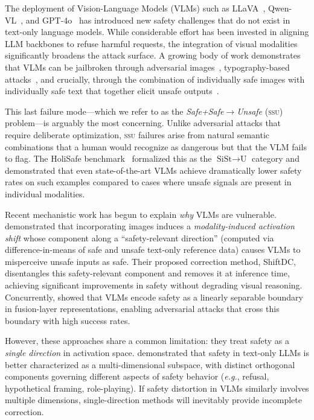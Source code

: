 \documentclass{article}
\newcommand{\ssu}{\textsc{ssu}}
\newcommand{\eg}{\emph{e.g.}}
\begin{document}
The deployment of Vision-Language Models (VLMs) such as LLaVA~\citep{liu2024visual},
Qwen-VL~\citep{bai2025qwen}, and GPT-4o~\citep{hurst2024gpt4o} has introduced
new safety challenges that do not exist in text-only language models.  While
considerable effort has been invested in aligning LLM backbones to refuse
harmful requests, the integration of visual modalities significantly broadens the
attack surface.  A growing body of work demonstrates that VLMs can be jailbroken
through adversarial images~\citep{qi2024visual,niu2024jailbreaking}, typography-based
attacks~\citep{gong2023figstep}, and crucially, through the combination of
individually safe images with individually safe text that together elicit unsafe
outputs~\citep{wang2024siuo,lee2025holisafe}.

This last failure mode---which we refer to as the \emph{Safe+Safe$\to$Unsafe}
(\ssu) problem---is arguably the most concerning.  Unlike adversarial attacks
that require deliberate optimization, \ssu{} failures arise from natural semantic
combinations that a human would recognize as dangerous but that the VLM fails to
flag.  The HoliSafe benchmark~\citep{lee2025holisafe} formalized this as the
$\text{SiSt}{\to}\text{U}$ category and demonstrated that even state-of-the-art
VLMs achieve dramatically lower safety rates on such examples compared to cases
where unsafe signals are present in individual modalities.

Recent mechanistic work has begun to explain \emph{why} VLMs are vulnerable.
\citet{zou2025shiftdc} demonstrated that incorporating images induces a
\emph{modality-induced activation shift} whose component along a
``safety-relevant direction'' (computed via difference-in-means of safe and
unsafe text-only reference data) causes VLMs to misperceive unsafe inputs as
safe.  Their proposed correction method, ShiftDC, disentangles this
safety-relevant component and removes it at inference time, achieving significant
improvements in safety without degrading visual reasoning.  Concurrently,
\citet{song2025jailbound} showed that VLMs encode safety as a linearly separable
boundary in fusion-layer representations, enabling adversarial attacks that cross
this boundary with high success rates.

However, these approaches share a common limitation: they treat safety as a
\emph{single direction} in activation space.  \citet{zhang2025hidden}
demonstrated that safety in text-only LLMs is better characterized as a
multi-dimensional subspace, with distinct orthogonal components governing
different aspects of safety behavior (\eg, refusal, hypothetical framing,
role-playing).  If safety distortion in VLMs similarly involves multiple
dimensions, single-direction methods will inevitably provide incomplete
correction.
\end{document}

